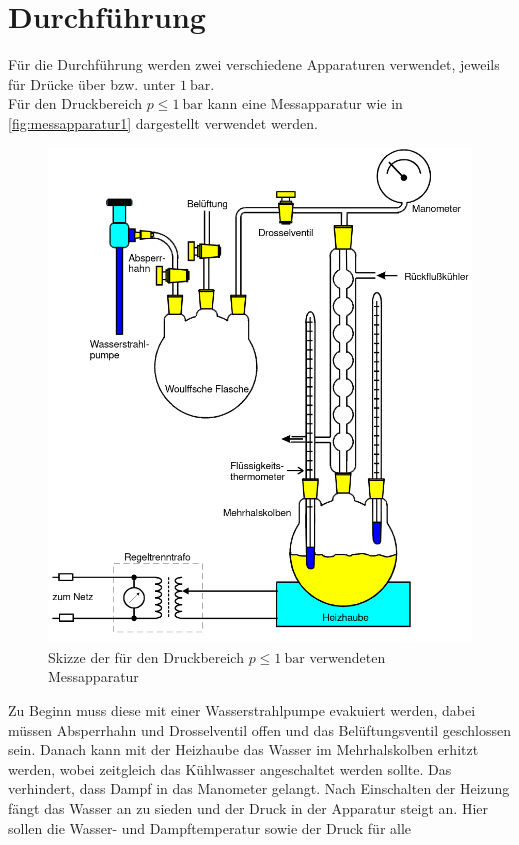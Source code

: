 \section{Durchführung}
\label{sec:Durchführung}
Für die Durchführung werden zwei verschiedene Apparaturen verwendet, jeweils für Drücke
über bzw. unter $\SI{1}{\bar}$.
\\
Für den Druckbereich $p \leq \SI{1}{\bar}$ kann eine Messapparatur wie in
\autoref{fig:messapparatur1} dargestellt verwendet werden.
\begin{figure}
	\centering
	\includegraphics[width=12cm]{images/messapparatur1.png}
	\caption{Skizze der für den Druckbereich $p \leq \SI{1}{\bar}$ verwendeten Messapparatur \cite{anleitung}}
	\label{fig:messapparatur1}
\end{figure}
Zu Beginn muss diese mit einer Wasserstrahlpumpe evakuiert werden, dabei müssen
Absperrhahn und Drosselventil offen und das Belüftungsventil geschlossen sein. Danach kann
mit der Heizhaube das Wasser im Mehrhalskolben erhitzt werden, wobei zeitgleich das
Kühlwasser angeschaltet werden sollte. Das verhindert, dass Dampf in das Manometer
gelangt. Nach Einschalten der Heizung fängt das Wasser an zu sieden und der Druck in der Apparatur
steigt an. Hier sollen die Wasser- und Dampftemperatur sowie der Druck für alle
